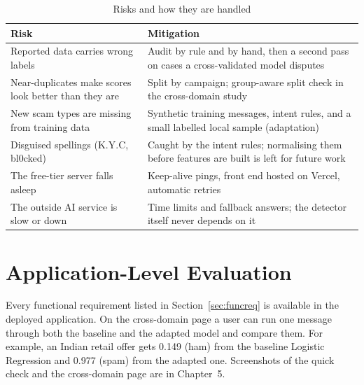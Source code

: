\begin{table}[H]
\centering
\caption{Risks and how they are handled}
\label{tab:risks}
\begin{tabular}{|L{5cm}|L{8.5cm}|}
\hline
\textbf{Risk} & \textbf{Mitigation} \\
\hline
Reported data carries wrong labels & Audit by rule and by hand, then a second pass on cases a cross-validated model disputes \\
\hline
Near-duplicates make scores look better than they are & Split by campaign; group-aware split check in the cross-domain study \\
\hline
New scam types are missing from training data & Synthetic training messages, intent rules, and a small labelled local sample (adaptation) \\
\hline
Disguised spellings (K.Y.C, bl0cked) & Caught by the intent rules; normalising them before features are built is left for future work \\
\hline
The free-tier server falls asleep & Keep-alive pings, front end hosted on Vercel, automatic retries \\
\hline
The outside AI service is slow or down & Time limits and fallback answers; the detector itself never depends on it \\
\hline
\end{tabular}
\end{table}

\section{Application-Level Evaluation}
Every functional requirement listed in Section~\ref{sec:funcreq} is available in the deployed application. On the cross-domain page a user can run one message through both the baseline and the adapted model and compare them. For example, an Indian retail offer gets 0.149 (ham) from the baseline Logistic Regression and 0.977 (spam) from the adapted one. Screenshots of the quick check and the cross-domain page are in Chapter~5.
